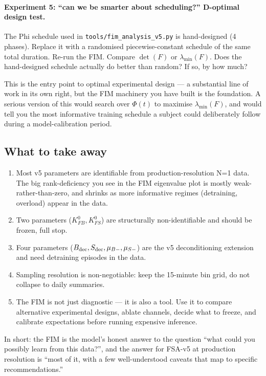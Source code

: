 \paragraph{Experiment 5: ``can we be smarter about scheduling?'' D-optimal design test.}
The Phi schedule used in \texttt{tools/fim\_analysis\_v5.py} is hand-designed (4 phases). Replace it with a randomised piecewise-constant schedule of the same total duration. Re-run the FIM. Compare $\det(F)$ or $\lambda_{\min}(F)$. Does the hand-designed schedule actually do better than random? If so, by how much?

This is the entry point to optimal experimental design --- a substantial line of work in its own right, but the FIM machinery you have built is the foundation. A serious version of this would search over $\Phi(t)$ to maximise $\lambda_{\min}(F)$, and would tell you the most informative training schedule a subject could deliberately follow during a model-calibration period.

\subsection{What to take away}

\begin{enumerate}
  \item Most v5 parameters are identifiable from production-resolution N=1 data. The big rank-deficiency you see in the FIM eigenvalue plot is mostly weak-rather-than-zero, and shrinks as more informative regimes (detraining, overload) appear in the data.
  \item Two parameters ($K_{FB}^0, K_{FS}^0$) are structurally non-identifiable and should be frozen, full stop.
  \item Four parameters ($B_{\rm dec}, S_{\rm dec}, \mu_{B-}, \mu_{S-}$) are the v5 deconditioning extension and need detraining episodes in the data.
  \item Sampling resolution is non-negotiable: keep the 15-minute bin grid, do not collapse to daily summaries.
  \item The FIM is not just diagnostic --- it is also a tool. Use it to compare alternative experimental designs, ablate channels, decide what to freeze, and calibrate expectations before running expensive inference.
\end{enumerate}

In short: the FIM is the model's honest answer to the question ``what could you possibly learn from this data?'', and the answer for FSA-v5 at production resolution is ``most of it, with a few well-understood caveats that map to specific recommendations.''
